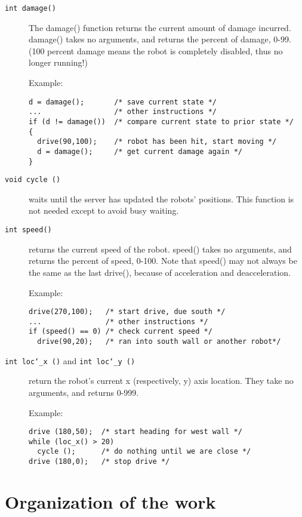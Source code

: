 \documentclass{article}
\def\UL{\char`\_}
\begin{document}
\begin{description}
\item[\texttt{int damage()}]
        The damage() function returns the current amount of damage
        incurred.  damage() takes no arguments, and returns the percent
        of damage, 0-99. (100 percent damage means the robot is
        completely disabled, thus no longer running!) 

        Example:
\begin{verbatim}
d = damage();       /* save current state */
...                 /* other instructions */
if (d != damage())  /* compare current state to prior state */
{
  drive(90,100);    /* robot has been hit, start moving */
  d = damage();     /* get current damage again */
} 
\end{verbatim}

\item[\texttt{void cycle ()}]
        waits until the server has updated the robots' positions.
        This function is not needed except to avoid busy waiting.

\item[\texttt{int speed()}]
        returns the current speed of the robot.
        speed() takes no arguments, and returns the percent of speed,
        0-100.  Note that speed() may not always be the same as the last
        drive(), because of acceleration and deacceleration.

        Example:
\begin{verbatim}
drive(270,100);   /* start drive, due south */
...               /* other instructions */
if (speed() == 0) /* check current speed */
  drive(90,20);   /* ran into south wall or another robot*/
\end{verbatim}

\item[\texttt{int loc\UL x ()} and \texttt{int loc\UL y ()}]
        return the robot's current x (respectively, y) axis location.
        They take no arguments, and returns 0-999.

        Example:
\begin{verbatim}
drive (180,50);  /* start heading for west wall */
while (loc_x() > 20)
  cycle ();      /* do nothing until we are close */
drive (180,0);   /* stop drive */
\end{verbatim}
\end{description}

\section{Organization of the work}
\end{document}
